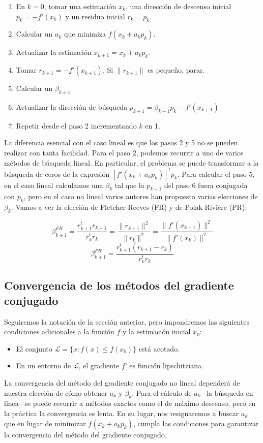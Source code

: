 \begin{enumerate}
	\item En $k=0$, tomar una estimación $x_k$, una dirección de descenso inicial $p_k=-f'(x_k)$ y un residuo inicial $r_k=p_k$.
	\item Calcular un $a_k$ que minimiza $f(x_k+a_k p_k)$.
	\item Actualizar la estimación $x_{k+1} = x_k + a_k p_k$.
	\item Tomar $r_{k+1}=-f'(x_{k+1})$. Si $\|r_{k+1}\|$ es pequeño, parar.
	\item Calcular un $\beta_{k+1}$
	\item Actualizar la dirección de búsqueda $p_{k+1} = \beta_{k+1} p_k-f'(x_{k+1})$
	\item Repetir desde el paso 2 incrementando $k$ en 1.
\end{enumerate}

La diferencia esencial con el caso lineal es que los pasos 2 y 5 no se pueden realizar con tanta facilidad. Para el paso 2, podemos recurrir a uno de varios métodos de búsqueda lineal. En particular, el problema se puede transformar a la búsqueda de ceros de la expresión $[f'(x_k + a_k p_k)]^{t} p_k$. Para calcular el paso 5, en el caso lineal calculamos una $\beta_k$ tal que la $p_{k+1}$ del paso 6 fuera conjugada con $p_k$, pero en el caso no lineal varios autores han propuesto varias elecciones de $\beta_k$. Vamos a ver la elección de Fletcher-Reeves (FR) y de Polak-Rivière (PR):

\[\beta_{k+1}^{FR} = \frac{r^t_{k+1} r_{k+1}}{r^t_k r_k} = \frac{\|r_{k+1}\|^2}{\|r_k\|^2} = \frac{\|f'(x_{k+1})\|^2}{\|f'(x_k)\|^2} \]
\[\beta_{k+1}^{PR} = \frac{r^t_{k+1} (r_{k+1}-r_k)}{r^t_k r_k} \]

\subsection{Convergencia de los métodos del gradiente conjugado}

Seguiremos la notación de la sección anterior, pero impondremos las siguientes condiciones adicionales a la función $f$ y la estimación inicial $x_0$:
\begin{itemize}
	\item El conjunto $\mathcal{L}=\{x : f(x) \leq f(x_0)\}$ está acotado.
	\item En un entorno de $\mathcal{L}$, el gradiente $f$' es función lipschitziana.
\end{itemize}

La convergencia del método del gradiente conjugado no lineal dependerá de nuestra elección de cómo obtener $a_k$ y $\beta_k$. Para el cálculo de $a_k$ --la búsqueda en línea-- se puede recurrir a métodos exactos como el de máximo descenso, pero en la práctica la convergencia es lenta. En su lugar, nos resignaremos a buscar $a_k$ que en lugar de minimizar $f(x_k+a_kp_k)$, cumpla las condiciones para garantizar la convergencia del método del gradiente conjugado.

